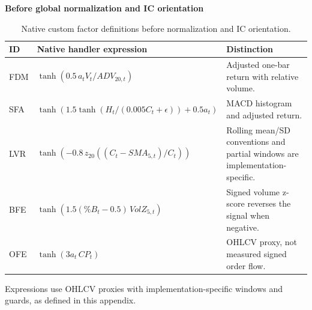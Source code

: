 \begin{table}[htb]
\centering\small
\setlength{\tabcolsep}{3pt}
\renewcommand{\arraystretch}{1.15}
\caption{Native custom factor definitions before normalization and IC orientation.}
\label{tab:custom_definitions}
\textbf{Before global normalization and IC orientation}\par\smallskip
\begin{tabular}{lp{8.0cm}p{5.0cm}}
\hline
ID & Native handler expression & Distinction \\
\hline
FDM & $\tanh(0.5\,a_t V_t/ADV_{20,t})$ & Adjusted one-bar return with relative volume. \\
SFA & $\tanh(1.5\tanh(H_t/(0.005C_t+\epsilon))+0.5a_t)$ & MACD histogram and adjusted return. \\
LVR & $\tanh(-0.8\,z_{20}((C_t-SMA_{5,t})/C_t))$ & Rolling mean/SD conventions and partial windows are implementation-specific. \\
BFE & $\tanh(1.5(\%B_t-0.5)\,VolZ_{5,t})$ & Signed volume z-score reverses the signal when negative. \\
OFE & $\tanh(3a_t\,CP_t)$ & OHLCV proxy, not measured signed order flow. \\
\hline
\end{tabular}\par\medskip
\begin{minipage}{\textwidth}\footnotesize Expressions use OHLCV proxies with implementation-specific windows and guards, as defined in this appendix.\end{minipage}
\end{table}
